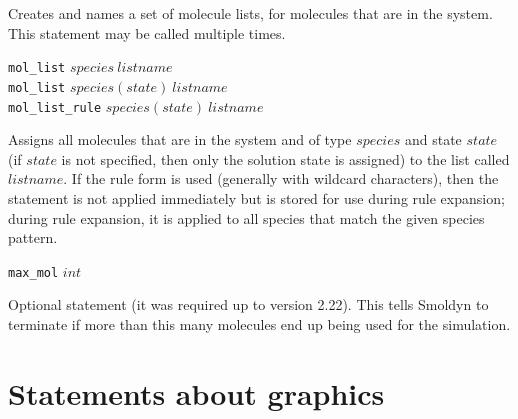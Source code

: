 \documentclass {scrbook}
\newcommand {\ttt} {\texttt}
\begin{document}
\begin{description}
Creates and names a set of molecule lists, for molecules that are in the system. This statement may be called multiple times.

\item{\ttt{mol\_list} $species\ listname$\\
\ttt{mol\_list} $species(state)\ listname$\\
\ttt{mol\_list\_rule} $species(state)\ listname$}

Assigns all molecules that are in the system and of type $species$ and state $state$ (if $state$ is not specified, then only the solution state is assigned) to the list called $listname$. If the rule form is used (generally with wildcard characters), then the statement is not applied immediately but is stored for use during rule expansion; during rule expansion, it is applied to all species that match the given species pattern.

\item{\ttt{max\_mol} $int$}

Optional statement (it was required up to version 2.22). This tells Smoldyn to terminate if more than this many molecules end up being used for the simulation.

\end{description}

\section{Statements about graphics}
\end{document}
